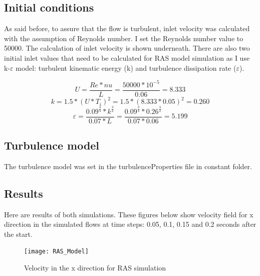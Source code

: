\documentclass[a4paper]{article}
\begin{document}
\subsection{Initial conditions}
As said before, to assure that the flow is turbulent, inlet velocity was calculated with the assumption of Reynolds number. I set the Reynolds number value to 50000. The calculation of inlet velocity is shown underneath. There are also two initial inlet values that need to be calculated for RAS model simulation as I use k-$\varepsilon$ model: turbulent kinematic energy (k) and turbulence dissipation rate ($\varepsilon$).

\[U = \frac{Re * nu}{L} = \frac{50000 * 10^{-5}}{0.06}=8.333\]
\[k = 1.5*(U*T_i)^2= 1.5*(8.333*0.05)^2=0.260\]
\[\varepsilon = \frac{0.09^{\frac{3}{4}}*k^{\frac{3}{2}}}{0.07*L}= \frac{0.09^{\frac{3}{4}}*0.26^{\frac{3}{2}}}{0.07*0.06}=5.199\]
\subsection{Turbulence model}
The turbulence model was set in the turbulenceProperties file in constant folder. 

\subsection{Results}
Here are results of both simulations. These figures below show velocity field for x direction in the simulated flows at time steps: 0.05, 0.1, 0.15 and 0.2 seconds after the start.\newpage

\begin{figure}[h!]
\centering
\texttt{[image: RAS\_Model]}
\caption{Velocity in the x direction for RAS simulation}
\label{fig:RAS_Model}
\end{figure}
\end{document}
